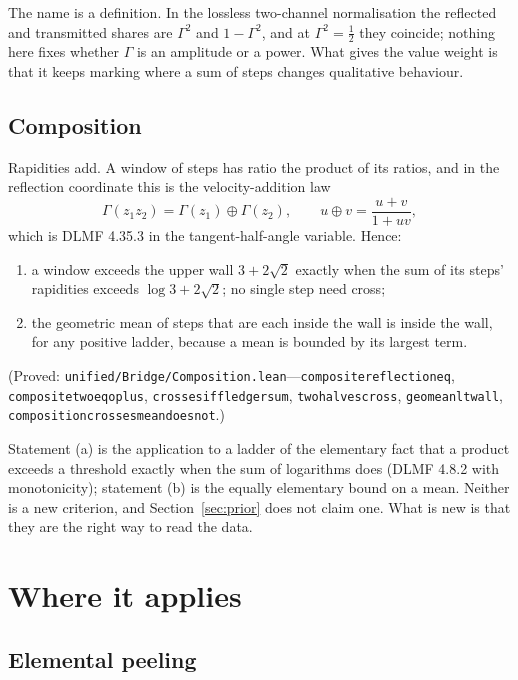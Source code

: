 \documentclass[11pt]{article}
\newcommand{\G}{\Gamma}
\renewcommand{\_}{\origunderscore\allowbreak}
\newcommand{\W}{3+2\sqrt{2}}
\begin{document}
The name is a definition. In the lossless two-channel normalisation the reflected and transmitted
shares are $\G^2$ and $1-\G^2$, and at $\G^2=\tfrac12$ they coincide; nothing here fixes whether
$\G$ is an amplitude or a power. What gives the value weight is that it keeps marking where a sum
of steps changes qualitative behaviour.

\subsection{Composition}

Rapidities add. A window of steps has ratio the product of its ratios, and in the reflection
coordinate this is the velocity-addition law
\begin{equation}
\G(z_1z_2)=\G(z_1)\oplus\G(z_2),\qquad u\oplus v=\frac{u+v}{1+uv}, \label{eq:oplus}
\end{equation}
which is DLMF 4.35.3 in the tangent-half-angle variable. Hence:
\begin{enumerate}[label=(\alph*)]
\item a window exceeds the upper wall $\W$ exactly when the sum of its steps' rapidities exceeds
  $\log\W$; no single step need cross;
\item the geometric mean of steps that are each inside the wall is inside the wall, for any
  positive ladder, because a mean is bounded by its largest term.
\end{enumerate}
(Proved: \texttt{unified/Bridge/Composition.lean}---\texttt{composite\_reflection\_eq},
\texttt{composite\_two\_eq\_oplus}, \texttt{crosses\_iff\_ledger\_sum}, \texttt{two\_halves\_cross},
\texttt{geomean\_lt\_wall}, \texttt{composition\_crosses\_mean\_does\_not}.)

Statement (a) is the application to a ladder of the elementary fact that a product exceeds a
threshold exactly when the sum of logarithms does (DLMF 4.8.2 with monotonicity); statement (b) is
the equally elementary bound on a mean. Neither is a new criterion, and Section~\ref{sec:prior}
does not claim one. What is new is that they are the right way to read the data.

\section{Where it applies}\label{sec:where}

\subsection{Elemental peeling}
\end{document}
